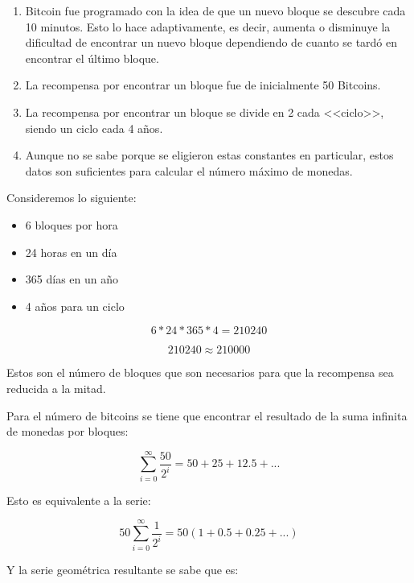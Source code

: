 \documentclass[12pt,letterpaper]{article}
\begin{document}
    \begin{enumerate}

        \item Bitcoin fue programado con la idea de que un nuevo bloque se descubre cada 10 minutos. Esto lo hace adaptivamente, es decir, aumenta o disminuye la dificultad de encontrar un nuevo bloque dependiendo de cuanto se tard\'o en encontrar el \'ultimo bloque.

        \item La recompensa por encontrar un bloque fue de inicialmente 50 Bitcoins.
            
        \item La recompensa por encontrar un bloque se divide en 2 cada <<ciclo>>, siendo un ciclo cada 4 a\~nos.

        \item Aunque no se sabe porque se eligieron estas constantes en particular, estos datos son suficientes para calcular el n\'umero m\'aximo de monedas.

    \end{enumerate}


    Consideremos lo siguiente: 
    \begin{itemize}
        \item 6 bloques por hora 

        \item 24 horas en un d\'ia

        \item 365 d\'ias en un a\~no

        \item4 a\~nos para un ciclo

    \end{itemize}

    $$6 * 24 * 365 * 4 = 210240$$

    $$210240 \approx 210000$$

    Estos son el n\'umero de bloques que son necesarios para que la recompensa sea reducida a la mitad.

    Para el n\'umero de bitcoins se tiene que encontrar el resultado de la suma infinita de monedas por bloques:
    
    $$ \sum_{i = 0}^{\infty} \frac{50}{2^{i}} = 50 + 25 + 12.5 + ...$$

    Esto es equivalente a la serie:

    $$ 50 \sum_{i = 0}^{\infty} \frac{1}{2^{i}} = 50 (1 + 0.5 + 0.25 + ...) $$

    Y la serie geom\'etrica resultante se sabe que es:
\end{document}
